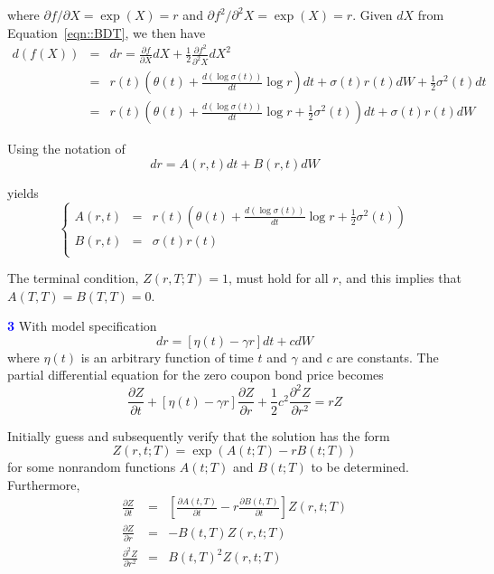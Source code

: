 \documentclass[a4paper,11pt] {article}
\begin{document}
where $\partial f / \partial X = \exp(X) = r$ and $\partial f^2 / \partial^2 X = \exp(X) = r$. Given $dX$ from Equation~\ref{eqn::BDT}, we then have
\begin{eqnarray*}
d(f(X)) &=& dr =  \frac{\partial f}{\partial X} dX + \frac{1}{2} \frac{\partial f^2}{\partial^2 X} dX^2 \\
        &=& r(t)\left( \theta(t) + \frac{d(\log\sigma(t))}{dt} \log r \right) dt + \sigma(t)r(t) dW + \frac{1}{2}\sigma^2(t) dt \\
        &=& r(t)\left( \theta(t) + \frac{d(\log\sigma(t))}{dt} \log r + \frac{1}{2} \sigma^2(t) \right) dt + \sigma(t)r(t) dW
\end{eqnarray*}

Using the notation of
$$
dr = A(r,t)dt + B(r,t)dW
$$

yields
$$
\left\{
  \begin{array}{ccl}
    A(r,t) & = & r(t)\left( \theta(t) + \frac{d(\log\sigma(t))}{dt} \log r + \frac{1}{2} \sigma^2(t) \right) \\
    B(r,t) & = & \sigma(t)r(t) \\
  \end{array}
\right.
$$

The terminal condition, $Z(r,T;T)=1$, must hold for all $r$, and this implies that $A(T,T)=B(T,T)=0$. 

\bigskip

\textcolor{blue}{\bf 3 } With model specification
$$
dr = [\eta(t)-\gamma r] dt + c dW
$$
where $\eta(t)$ is an arbitrary function of time $t$ and $\gamma$ and $c$ are constants. The partial differential
equation for the zero coupon bond price becomes
\begin{equation} \label{eqn::bond_hw}
\frac{\partial Z}{\partial t} + [\eta(t)-\gamma r]\frac{\partial Z}{\partial r} + \frac{1}{2}c^2 \frac{\partial^2 Z}{\partial r^2} = rZ
\end{equation}

Initially guess and subsequently verify that the solution has the form
$$
Z(r,t;T) = \exp(A(t;T)-rB(t;T))
$$
for some nonrandom functions $A(t;T)$ and $B(t;T)$ to be determined. Furthermore,
\begin{eqnarray*}
\frac{\partial Z}{\partial t}       &=& \left[\frac{\partial A(t,T)}{\partial t} - r\frac{\partial B(t,T)}{\partial t}\right]Z(r,t;T) \\
\frac{\partial Z}{\partial r}       &=& -B(t,T)Z(r,t;T) \\
\frac{\partial^2 Z}{\partial r^2}   &=& B(t,T)^2 Z(r,t;T)
\end{eqnarray*}
\end{document}
